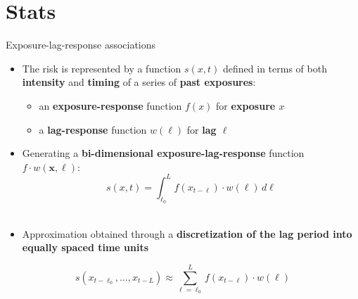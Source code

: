 \documentclass[english]{beamer}
\newcommand{\alertblue}[1]{{\color{blue}#1}}
\begin{document}
\section{Stats}
\begin{frame}{Exposure-lag-response associations }
    \begin{itemize}
        \item The risk is represented by a function \alertblue{$s(x, t)$} defined in terms of both \textbf{\alertblue{intensity}} and \textbf{\alertblue{timing}} of a series of \textbf{\alertblue{past exposures}}:
        \vspace{0.1cm}
        \begin{itemize}
            \item an \textbf{\alertblue{exposure-response}} function \alertblue{$f(x)$} for \textbf{\alertblue{exposure $x$}}
            \item a \textbf{\alertblue{lag-response}} function \alertblue{$w(\ell)$} for \textbf{\alertblue{lag $\ell$}}
        \end{itemize}
        \vspace{0.1cm}
        \item Generating a \textbf{\alertblue{bi-dimensional exposure-lag-response}} function 
        \alertblue{\( f \cdot w(\bm{x}, \ell) \)}: \\
        \[
        s(x, t) = \int_{\ell_0}^{L} f(x_{t-\ell}) \cdot w(\ell) \, d\ell \] \\
        \end{itemize}
    \begin{itemize}
        \item Approximation obtained through a \textbf{\alertblue{discretization of the lag period into equally spaced time units}}
    \end{itemize}
        \[
        s(x_{t-\ell_0}, \dots, x_{t-L}) \approx \sum_{\ell = \ell_0}^{L} f(x_{t-\ell}) \cdot w( \ell)
        \]
\end{frame}
\end{document}
